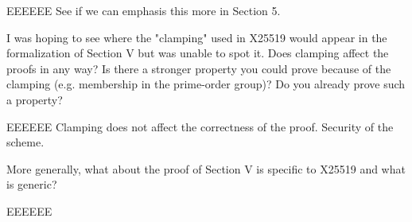 \begin{answer}{EEEEEE}
See if we can emphasis this more in Section 5.
\end{answer}

I was hoping to see where the "clamping" used in X25519 would appear in the
formalization of Section V but was unable to spot it. Does clamping affect the
proofs in any way? Is there a stronger property you could prove because of the
clamping (e.g. membership in the prime-order group)?
Do you already prove such a property?

\begin{answer}{EEEEEE}
Clamping does not affect the correctness of the proof.
Security of the scheme.
\end{answer}

More generally, what about the proof of
Section V is specific to X25519 and what is generic?

\begin{answer}{EEEEEE}
\end{answer}
